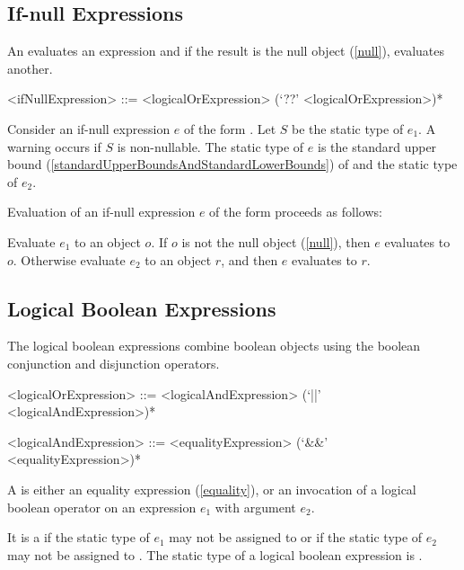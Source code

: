 \documentclass[makeidx]{article}
\begin{document}
\subsection{If-null Expressions}

\LMHash{}%
An  evaluates an expression and
if the result is the null object (\ref{null}), evaluates another.

\begin{grammar}
<ifNullExpression> ::= <logicalOrExpression> (`??' <logicalOrExpression>)*
\end{grammar}

\LMHash{}%
Consider an if-null expression $e$ of the form .
Let $S$ be the static type of $e_1$.
A warning occurs if $S$ is non-nullable.
The static type of $e$ is the standard upper bound
(\ref{standardUpperBoundsAndStandardLowerBounds})
of  and the static type of $e_2$.

\LMHash{}%
Evaluation of an if-null expression $e$ of the form 
proceeds as follows:

\LMHash{}%
Evaluate $e_1$ to an object $o$.
If $o$ is not the null object (\ref{null}), then $e$ evaluates to $o$.
Otherwise evaluate $e_2$ to an object $r$,
and then $e$ evaluates to $r$.


\subsection{Logical Boolean Expressions}

\LMHash{}%
The logical boolean expressions combine boolean objects using
the boolean conjunction and disjunction operators.

\begin{grammar}
<logicalOrExpression> ::= \gnewline{}
  <logicalAndExpression> (`||' <logicalAndExpression>)*

<logicalAndExpression> ::= <equalityExpression> (`\&\&' <equalityExpression>)*
\end{grammar}

\LMHash{}%
A  is either an equality expression
(\ref{equality}),
or an invocation of a logical boolean operator on
an expression $e_1$ with argument $e_2$.

\LMHash{}%
It is a  if
the static type of $e_1$ may not be assigned to 
or if the static type of $e_2$ may not be assigned to .
The static type of a logical boolean expression is .
\end{document}
